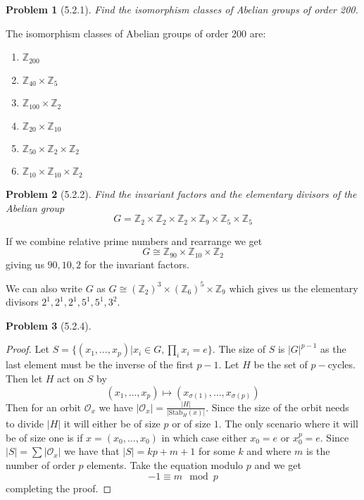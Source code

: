 \documentclass[10pt]{article}
\newcommand{\sk}{\vskip 10mm}
\newcommand{\bb}[1]{\mathbb{#1}}
\theoremstyle{plain}
\newtheorem{problem}{Problem}
\theoremstyle{remark}
\begin{document}
\begin{problem}[5.2.1]
  Find the isomorphism classes of Abelian groups of order 200.
\end{problem}

The isomorphism classes of Abelian groups of order 200 are:
\begin{enumerate}
\item $\bb{Z}_{200}$
\item $\bb{Z}_{40}\times\bb{Z}_{5}$
\item $\bb{Z}_{100}\times\bb{Z}_{2}$
\item $\bb{Z}_{20}\times\bb{Z}_{10}$
\item $\bb{Z}_{50}\times\bb{Z}_{2}\times\bb{Z}_{2}$
\item $\bb{Z}_{10}\times\bb{Z}_{10}\times\bb{Z}_{2}$
\end{enumerate}

\sk

\begin{problem}[5.2.2]
  Find the invariant factors and the elementary divisors of the Abelian
  group
  \[ G=\bb{Z}_2\times\bb{Z}_2\times\bb{Z}_2\times\bb{Z}_9\times\bb{Z}_5\times\bb{Z}_5\]
\end{problem}

If we combine relative prime numbers and rearrange we get
\[ G\cong \bb{Z}_{90}\times \bb{Z}_{10}\times \bb{Z}_2\]
giving us $90,10,2$ for the invariant factors.

We can also write $G$ as
$G\cong (\bb{Z}_2)^3\times(\bb{Z}_6)^5\times\bb{Z}_9$
which gives us the elementary divisors
$2^1,2^1,2^1,5^1,5^1,3^2$.

\sk

\begin{problem}[5.2.4]
  
\end{problem}

\begin{proof}
  Let $S=\{(x_1,\ldots,x_p)|x_i\in G,\prod_ix_i=e\}$. The size of $S$ is
  $|G|^{p-1}$ as the last element must be the inverse of the first
  $p-1$. Let $H$ be the set of $p-$cycles. Then let $H$ act on
  $S$ by
  \[ (x_1,\ldots,x_p)\mapsto(x_{\sigma(1)},\ldots,x_{\sigma(p)})\]
  Then for an orbit $\mathcal{O}_x$ we have
  $|\mathcal{O}_x|=\frac{|H|}{|\text{Stab}_H(x)|}$. Since the
  size of the orbit needs to divide $|H|$ it will
  either be of size $p$ or of size $1$. The only scenario where
  it will be of size one is if $x=(x_0,\ldots,x_0)$ in which
  case either $x_0=e$ or $x_0^p=e$. Since $|S|=\sum|\mathcal{O}_x|$
  we have that $|S|=kp+m+1$ for some $k$ and where $m$ is the number
  of order $p$ elements. Take the equation modulo
  $p$ and we get
  \[ -1 \equiv m\mod p\]
  completing the proof.
\end{proof}
\end{document}
